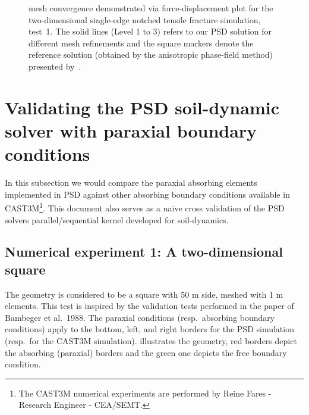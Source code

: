 \begin{figure}[tb]
\begin{minipage}{1\textwidth}
	\end{minipage}
	\caption{mesh convergence demonstrated via force-displacement plot for the two-dimensional single-edge notched tensile fracture simulation, test~1. The solid lines (Level 1 to 3) refers to our PSD solution for different mesh refinements and the square markers denote the reference solution (obtained by the anisotropic phase-field method) presented by~\cite{amor2009regularized}.\label{fig:force-comp-2d-tensile-crack}}
\end{figure}

\section{Validating the PSD soil-dynamic solver with paraxial boundary conditions}
In this subsection we would compare the paraxial absorbing elements implemented in PSD against other absorbing boundary conditions available in CAST3M\footnote{The CAST3M numerical experiments are performed by Reine Fares - Research Engineer - CEA/SEMT.}. This document also serves as a naive cross validation of the PSD solvers parallel/sequential kernel developed for soil-dynamics.

\subsection{Numerical experiment 1: A two-dimensional square}
The geometry is considered to be a square with 50 m side, meshed with 1 m elements. This test is inspired by the validation tests performed in the paper of Bambeger et al.~1988. The paraxial conditions (resp.~absorbing boundary conditions)  apply to the bottom, left, and right borders for the PSD simulation (resp.~for the CAST3M simulation).  illustrates the geometry, red borders depict the absorbing (paraxial) borders and the green one depicts the free boundary condition. 

